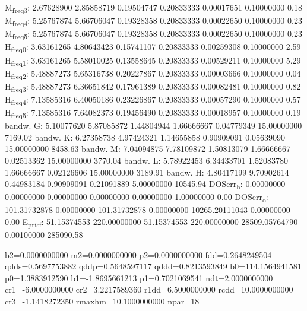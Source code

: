 \documentclass[11pt]{article}
\begin{document}
M\textsubscript{freq}\textsubscript{3}:   2.67628900   2.85858719   0.19504747   0.20833333   0.00017651   0.10000000         0.18
M\textsubscript{freq}\textsubscript{4}:   5.25767874   5.66706047   0.19328358   0.20833333   0.00022650   0.10000000         0.23
M\textsubscript{freq}\textsubscript{5}:   5.25767874   5.66706047   0.19328358   0.20833333   0.00022650   0.10000000         0.23
H\textsubscript{freq}\textsubscript{0}:   3.63161265   4.80643423   0.15741107   0.20833333   0.00259308   0.10000000         2.59
H\textsubscript{freq}\textsubscript{1}:   3.63161265   5.58010025   0.13558645   0.20833333   0.00529211   0.10000000         5.29
H\textsubscript{freq}\textsubscript{2}:   5.48887273   5.65316738   0.20227867   0.20833333   0.00003666   0.10000000         0.04
H\textsubscript{freq}\textsubscript{3}:   5.48887273   6.36651842   0.17961389   0.20833333   0.00082481   0.10000000         0.82
H\textsubscript{freq}\textsubscript{4}:   7.13585316   6.40050186   0.23226867   0.20833333   0.00057290   0.10000000         0.57
H\textsubscript{freq}\textsubscript{5}:   7.13585316   7.64082373   0.19456490   0.20833333   0.00018957   0.10000000         0.19
bandw. G:   5.10077620   5.87085872   1.44804944   1.66666667   0.04779349  15.00000000      7169.02
bandw. K:   6.27358738   4.97424321   1.14655858   0.90909091   0.05639090  15.00000000      8458.63
bandw. M:   7.04094875   7.78109872   1.50813079   1.66666667   0.02513362  15.00000000      3770.04
bandw. L:   5.78922453   6.34433701   1.52083780   1.66666667   0.02126606  15.00000000      3189.91
bandw. H:   4.80417199   9.70902614   0.44983184   0.90909091   0.21091889   5.00000000     10545.94
DOSerr\textsubscript{h}:   0.00000000   0.00000000   0.00000000   0.00000000   0.00000000   1.00000000         0.00
DOSerr\textsubscript{o}: 101.31732878   0.00000000 101.31732878   0.00000000 10265.20111043   0.00000000         0.00
E\textsubscript{pris}\textsubscript{f}:  51.15374553 220.00000000  51.15374553 220.00000000 28509.05764790   0.00100000    285090.58

b2=0.0000000000 m2=0.0000000000 p2=0.0000000000 fdd=0.2648249504 qdds=0.5697753882 qddp=0.5648597117 qddd=0.8213593849 b0=114.1564941581 p0=1.3883912590 b1=-1.8695661213 p1=0.7021069541 ndt=2.0000000000 cr1=-6.0000000000 cr2=3.2217589360 r1dd=6.5000000000 rcdd=10.0000000000 cr3=-1.1418272350 rmaxhm=10.1000000000 npar=18 
\end{document}
